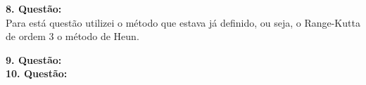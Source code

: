 \documentclass[a4paper,12pt]{article}
\begin{document}
\textbf{8. Quest\~ao:}\\
Para est\'a quest\~ao utilizei o m\'etodo que estava j\'a definido, ou seja, o Range-Kutta de ordem 3 o m\'etodo de
Heun.



\begin{figure}[!h]
	\centering
\end{figure}

\textbf{9. Quest\~ao:}\\



\textbf{10. Quest\~ao:}\\
\end{document}
